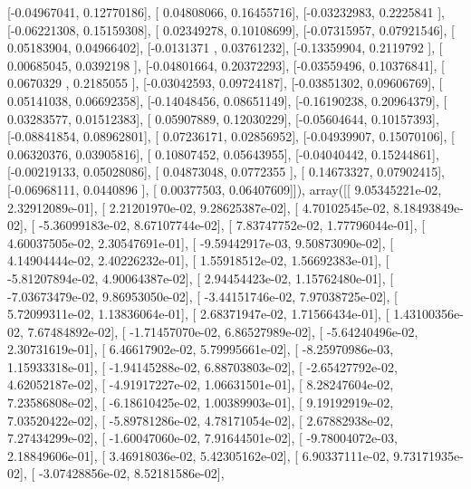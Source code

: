 \documentclass{article}
\begin{document}
       [-0.04967041,  0.12770186],
       [ 0.04808066,  0.16455716],
       [-0.03232983,  0.2225841 ],
       [-0.06221308,  0.15159308],
       [ 0.02349278,  0.10108699],
       [-0.07315957,  0.07921546],
       [ 0.05183904,  0.04966402],
       [-0.0131371 ,  0.03761232],
       [-0.13359904,  0.2119792 ],
       [ 0.00685045,  0.0392198 ],
       [-0.04801664,  0.20372293],
       [-0.03559496,  0.10376841],
       [ 0.0670329 ,  0.2185055 ],
       [-0.03042593,  0.09724187],
       [-0.03851302,  0.09606769],
       [ 0.05141038,  0.06692358],
       [-0.14048456,  0.08651149],
       [-0.16190238,  0.20964379],
       [ 0.03283577,  0.01512383],
       [ 0.05907889,  0.12030229],
       [-0.05604644,  0.10157393],
       [-0.08841854,  0.08962801],
       [ 0.07236171,  0.02856952],
       [-0.04939907,  0.15070106],
       [ 0.06320376,  0.03905816],
       [ 0.10807452,  0.05643955],
       [-0.04040442,  0.15244861],
       [-0.00219133,  0.05028086],
       [ 0.04873048,  0.0772355 ],
       [ 0.14673327,  0.07902415],
       [-0.06968111,  0.0440896 ],
       [ 0.00377503,  0.06407609]]), array([[  9.05345221e-02,   2.32912089e-01],
       [  2.21201970e-02,   9.28625387e-02],
       [  4.70102545e-02,   8.18493849e-02],
       [ -5.36099183e-02,   8.67107744e-02],
       [  7.83747752e-02,   1.77796044e-01],
       [  4.60037505e-02,   2.30547691e-01],
       [ -9.59442917e-03,   9.50873090e-02],
       [  4.14904444e-02,   2.40226232e-01],
       [  1.55918512e-02,   1.56692383e-01],
       [ -5.81207894e-02,   4.90064387e-02],
       [  2.94454423e-02,   1.15762480e-01],
       [ -7.03673479e-02,   9.86953050e-02],
       [ -3.44151746e-02,   7.97038725e-02],
       [  5.72099311e-02,   1.13836064e-01],
       [  2.68371947e-02,   1.71566434e-01],
       [  1.43100356e-02,   7.67484892e-02],
       [ -1.71457070e-02,   6.86527989e-02],
       [ -5.64240496e-02,   2.30731619e-01],
       [  6.46617902e-02,   5.79995661e-02],
       [ -8.25970986e-03,   1.15933318e-01],
       [ -1.94145288e-02,   6.88703803e-02],
       [ -2.65427792e-02,   4.62052187e-02],
       [ -4.91917227e-02,   1.06631501e-01],
       [  8.28247604e-02,   7.23586808e-02],
       [ -6.18610425e-02,   1.00389903e-01],
       [  9.19192919e-02,   7.03520422e-02],
       [ -5.89781286e-02,   4.78171054e-02],
       [  2.67882938e-02,   7.27434299e-02],
       [ -1.60047060e-02,   7.91644501e-02],
       [ -9.78004072e-03,   2.18849606e-01],
       [  3.46918036e-02,   5.42305162e-02],
       [  6.90337111e-02,   9.73171935e-02],
       [ -3.07428856e-02,   8.52181586e-02],
\end{document}
